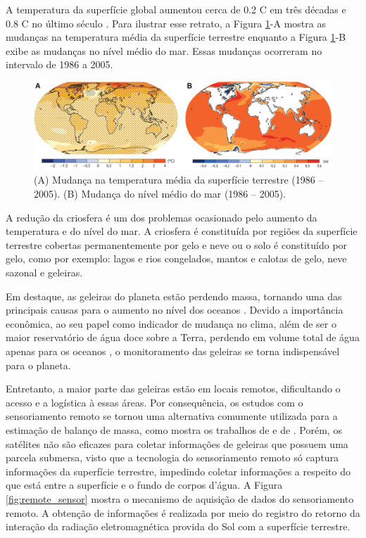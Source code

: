 A temperatura da superfície global aumentou cerca de 0.2 \textordmasculine C em três décadas e 0.8 \textordmasculine C no último século \cite{hansen2006global}. Para ilustrar esse retrato, a Figura \ref{fig:ast-and-sl}-A mostra as mudanças na temperatura média da superfície terrestre enquanto a Figura \ref{fig:ast-and-sl}-B exibe as mudanças no nível médio do mar. Essas mudanças ocorreram no intervalo de 1986 a 2005.

\begin{figure}[H]
    \centering
    \includegraphics[scale=0.27]{dados/figuras/ast-and-sl.png}
    \caption{(A) Mudança na temperatura média da superfície terrestre (1986 -- 2005). (B) Mudança do nível médio do mar (1986 -- 2005).}
    \vspace{-0.8em}
    \label{fig:ast-and-sl}
\end{figure}

A redução da criosfera é um dos problemas ocasionado pelo aumento da temperatura e do nível do mar. A criosfera é constituída por regiões da superfície terrestre cobertas permanentemente por gelo e neve ou o solo é constituído por gelo, como por exemplo: lagos e rios congelados, mantos e calotas de gelo, neve sazonal e geleiras.

Em destaque, as geleiras do planeta estão perdendo massa, tornando uma das principais causas para o aumento no nível dos oceanos \cite{rietbroek2016revisiting}. Devido a importância econômica, ao seu papel como indicador de mudança no clima, além de ser o maior reservatório de água doce sobre a Terra, perdendo em volume total de água apenas para os oceanos \cite{pinto2015crise}, o monitoramento das geleiras se torna indispensável para o planeta.

Entretanto, a maior parte das geleiras estão em locais remotos, dificultando o acesso e a logística à essas áreas. 
Por consequência, os estudos com o sensoriamento remoto se tornou uma alternativa comumente utilizada para a estimação de balanço de massa, como mostra os trabalhos de \cite{rojas2016darwin} e de \cite{mendonca2013greyglacier}.
Porém, os satélites não são eficazes para coletar informações de geleiras que possuem uma parcela submersa, visto que a tecnologia do sensoriamento remoto só captura informações da superfície terrestre, impedindo coletar informações a respeito do que está entre a superfície e o fundo de corpos d'água. 
A Figura \ref{fig:remote_sensor} mostra o mecanismo de aquisição de dados do sensoriamento remoto. A obtenção de informações é realizada por meio do registro do retorno da interação da radiação eletromagnética provida do Sol com a superfície terrestre. 

